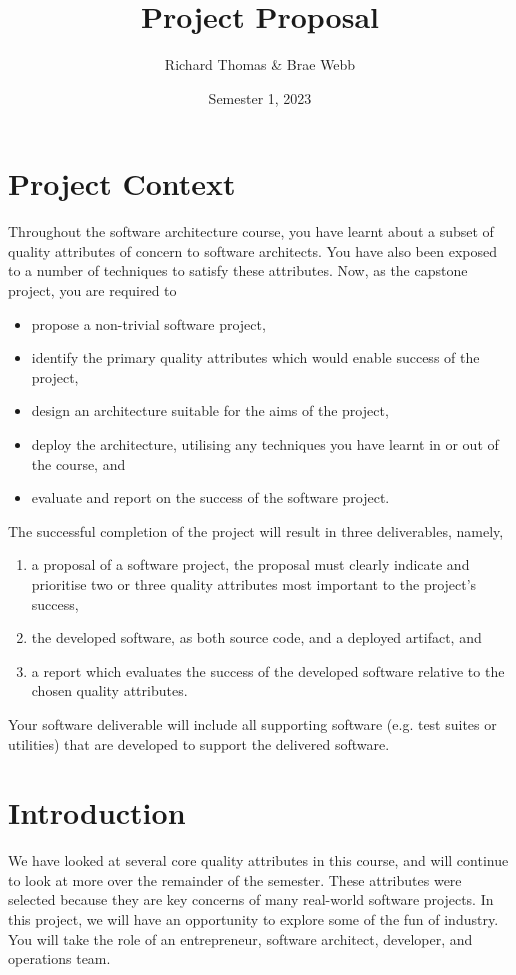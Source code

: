 \documentclass{csse4400}
\title{Project Proposal}
\author{Richard Thomas \& Brae Webb}
\date{Semester 1, 2023}
\begin{document}
\maketitle

\section*{Project Context}
Throughout the software architecture course,
you have learnt about a subset of quality attributes of concern to software architects.
You have also been exposed to a number of techniques to satisfy these attributes.
Now, as the capstone project, you are required to
\begin{itemize}
    \item propose a non-trivial software project,
    \item identify the primary quality attributes which would enable success of the project,
    \item design an architecture suitable for the aims of the project,
    \item deploy the architecture, utilising any techniques you have learnt in or out of the course, and
    \item evaluate and report on the success of the software project.
\end{itemize}

\noindent
The successful completion of the project will result in three deliverables, namely,
\begin{enumerate}[label=\roman*]
    \item a proposal of a software project, the proposal must clearly indicate and prioritise two or three quality attributes most important to the project's success,
    \item the developed software,	 as both source code, and a deployed artifact, and
    \item a report which evaluates the success of the developed software relative to the chosen quality attributes.
\end{enumerate}

\noindent
Your software deliverable will include all supporting software (e.g. test suites or utilities) that are developed to support the delivered software.

\section{Introduction}
We have looked at several core quality attributes in this course, and will continue to look at more over the remainder of the semester.
These attributes were selected because they are key concerns of many real-world software projects.
In this project, we will have an opportunity to explore some of the fun of industry.
You will take the role of an entrepreneur, software architect, developer, and operations team.
\end{document}
